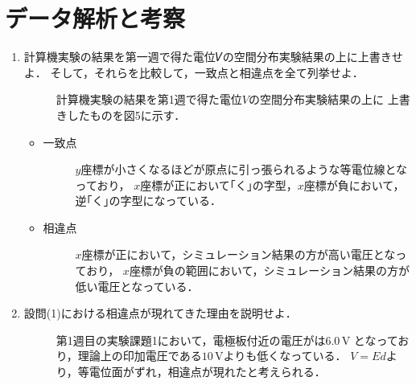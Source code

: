 
\section{データ解析と考察}

\begin{enumerate}
    \item 計算機実験の結果を第一週で得た電位𝑉の空間分布実験結果の上に上書きせよ．
    そして，それらを比較して，一致点と相違点を全て列挙せよ．
    \begin{description}
        \item[] 計算機実験の結果を第1週で得た電位$V$の空間分布実験結果の上に
        上書きしたものを図5に示す．
    \end{description}
    
    \begin{itemize}
        \item 一致点
        \begin{description}
            \item[] $y$座標が小さくなるほどが原点に引っ張られるような等電位線となっており，
            $x$座標が正において｢く｣の字型，$x$座標が負において，逆｢く｣の字型になっている．
        \end{description}

        \item 相違点
        \begin{description}
            \item[] $x$座標が正において，シミュレーション結果の方が高い電圧となっており，
            $x$座標が負の範囲において，シミュレーション結果の方が低い電圧となっている．
        \end{description}
    \end{itemize}

    \item 設問(1)における相違点が現れてきた理由を説明せよ．
    \begin{description}
        \item[] 第1週目の実験課題1において，電極板付近の電圧がは$6.0\,\si{\volt}$
        となっており，理論上の印加電圧である$10\,\si{\volt}$よりも低くなっている．
        $V=Ed$より，等電位面がずれ，相違点が現れたと考えられる．
    \end{description}
\end{enumerate}

